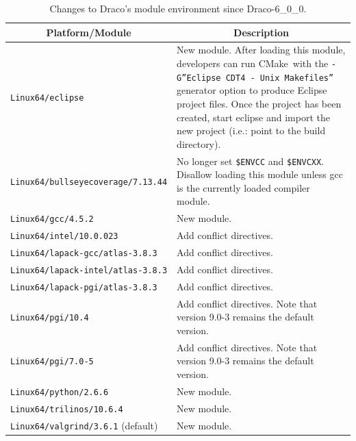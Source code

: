 \documentclass[note]{ResearchNote_pdf}
\newcommand{\draco}{Draco}
\newcommand{\cmake}{\textsf{CMake}}
\newcommand{\tableText}[1]{{\raggedright #1}}
\begin{document}
\begin{table}[!ht]
  \caption{Changes to \draco's module environment since \draco-6\_0\_0.}
  \label{tab:modulesdelta}
  \begin{center}
    \begin{tabular}{lp{3in}}\hline\hline
      \multicolumn{1}{c}{Platform/Module} & 
      \multicolumn{1}{c}{Description} \\ \hline
      
      \texttt{Linux64/eclipse} & \tableText{New module.  After loading
        this module, developers can run \cmake\ with the
        \texttt{-G''Eclipse CDT4 - Unix Makefiles''} generator option
        to produce Eclipse project files.  Once the project has been
        created, start eclipse and import the new project (i.e.: point
        to the build directory).} \\
      
      \texttt{Linux64/bullseyecoverage/7.13.44} & \tableText{No longer
        set \texttt{\$ENV{CC}} and \texttt{\$ENV{CXX}}.  Disallow
        loading this module unless gcc is the currently loaded
        compiler module.} \\

      \texttt{Linux64/gcc/4.5.2} & \tableText{New module.} \\

      \texttt{Linux64/intel/10.0.023} & \tableText{Add conflict
        directives.} \\ 

      \texttt{Linux64/lapack-gcc/atlas-3.8.3} & \tableText{Add
        conflict directives.} \\
      \texttt{Linux64/lapack-intel/atlas-3.8.3} & \tableText{Add
        conflict directives.} \\
      \texttt{Linux64/lapack-pgi/atlas-3.8.3} & \tableText{Add
        conflict directives.} \\

      \texttt{Linux64/pgi/10.4} & \tableText{Add conflict directives.
        Note that version 9.0-3 remains the default version.} \\
      \texttt{Linux64/pgi/7.0-5} & \tableText{Add conflict directives.
        Note that version 9.0-3 remains the default version.} \\

      \texttt{Linux64/python/2.6.6} & \tableText{New module.} \\
      \texttt{Linux64/trilinos/10.6.4} & \tableText{New module.} \\
      \texttt{Linux64/valgrind/3.6.1} (default) & \tableText{New module.} \\


\end{tabular}
\end{center}
\end{table}
\end{document}
